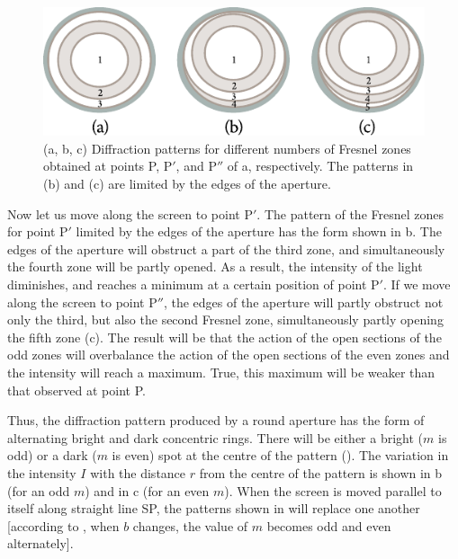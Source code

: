 \begin{figure}[t]
	\begin{center}
		\includegraphics[scale=1]{figures/ch_18/fig_18_11.pdf}
        \caption[]{(a, b, c) Diffraction patterns for different numbers of Fresnel zones obtained at points P, P$'$, and P$''$ of a, respectively. The patterns in (b) and (c) are limited by the edges of the aperture.}
		\label{fig:18_11}
	\end{center}
	\vspace{-0.8cm}
\end{figure}

Now let us move along the screen to point P$'$.
The pattern of the Fresnel zones for point P$'$ limited by the edges of the aperture has the form shown in b.
The edges of the aperture will obstruct a part of the third zone, and simultaneously the fourth zone will be partly opened.
As a result, the intensity of the light diminishes, and reaches a minimum at a certain position of point P$'$.
If we move along the screen to point P$''$, the edges of the aperture will partly obstruct not only the third, but also the second Fresnel zone, simultaneously partly opening the fifth zone (c).
The result will be that the action of the open sections of the odd zones will overbalance the action of the open sections of the even zones and the intensity will reach a maximum.
True, this maximum will be weaker than that observed at point P.

Thus, the diffraction pattern produced by a round aperture has the form of alternating bright and dark concentric rings.
There will be either a bright ($m$ is odd) or a dark ($m$ is even) spot at the centre of the pattern ().
The variation in the intensity $I$ with the distance $r$ from the centre of the pattern is shown in b (for an odd $m$) and in c (for an even $m$).
When the screen is moved parallel to itself along straight line SP, the patterns shown in  will replace one another [according to , when $b$ changes, the value of $m$ becomes odd and even alternately].

